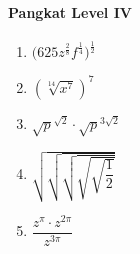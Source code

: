 \documentclass[12pt,a4paper,twocolumn]{article}
\begin{document}
	\paragraph{Pangkat Level IV}
		\begin{enumerate}
			\item $\big(625z^{\frac{2}{8}}f^{\frac{1}{4}}\big)^{\frac{1}{2}}$
			\item $(\sqrt[14]{x^7})^7$
			\item $\sqrt{p}^{\sqrt{2}} \cdot \sqrt{p}^{3\sqrt{2}}$
			\item $\sqrt{\sqrt{\sqrt{\sqrt{\sqrt{\dfrac{1}{2}}}}}}$
			\item $\dfrac{z^\pi\cdot z^{2\pi}}{z^{3\pi}} $
		\end{enumerate}
\end{document}
